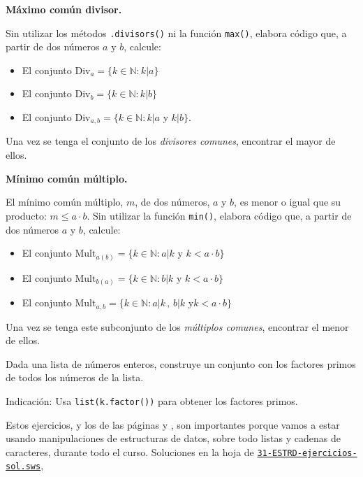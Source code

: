 \begin{ejer} {\bf Máximo común divisor.} 

Sin utilizar los métodos \lstinline|.divisors()| ni la función
\lstinline|max()|, 
elabora código que, a partir de dos números $a$ y $b$, calcule:
\begin{itemize}
\item El conjunto $\mathrm{Div}_a=\{k \in \mathbb N : k|a\}$
\item El conjunto $\mathrm{Div}_b=\{k \in \mathbb N : k|b\}$
\item El conjunto $\mathrm{Div}_{a,b}=\{k \in \mathbb N : k|a \text{ y } k|b\}$.
\end{itemize}
Una vez se tenga el conjunto de los \emph{divisores comunes}, encontrar el mayor
de ellos.
\end{ejer}


\begin{ejer} {\bf Mínimo común múltiplo.}

El mínimo común múltiplo, $m$, de dos números, $a$ y $b$, es menor o igual que
su
producto: $m\le a\cdot b$. Sin utilizar la función \lstinline|min()|, elabora
código 
que, a partir de dos números $a$ y $b$, calcule:
\begin{itemize}
\item El conjunto $\mathrm{Mult}_{a(b)}=\{k\in\mathbb{N}: a|k \text{ y }k<a\cdot
b\}$
\item El conjunto $\mathrm{Mult}_{b(a)}=\{k\in\mathbb{N}: b|k \text{ y }k<a\cdot
b\}$
\item El conjunto $\mathrm{Mult}_{a,b}=\{k\in\mathbb{N}: a|k\,,\,b|k \text{ y
}k<a\cdot
b\}$
\end{itemize}
Una vez se tenga este subconjunto de los \emph{múltiplos comunes}, encontrar el
menor de
ellos.
\end{ejer}

\begin{ejer}
Dada una lista de números enteros, construye un conjunto con los factores primos
de 
todos los números de la lista.

Indicación: Usa \lstinline|list(k.factor())| para obtener los factores primos.
\end{ejer}

Estos ejercicios, y los de las p\'aginas \pageref{ejer-0} y \pageref{ejer-1},
son importantes porque
vamos a estar usando  manipulaciones de estructuras de datos, sobre todo listas
y cadenas de caracteres, durante todo el curso. 
Soluciones en la hoja de {\sage}
\href{http://sage.mat.uam.es:8888/home/pub/??/}{\tt31-ESTRD-ejercicios-sol.sws},
                                
